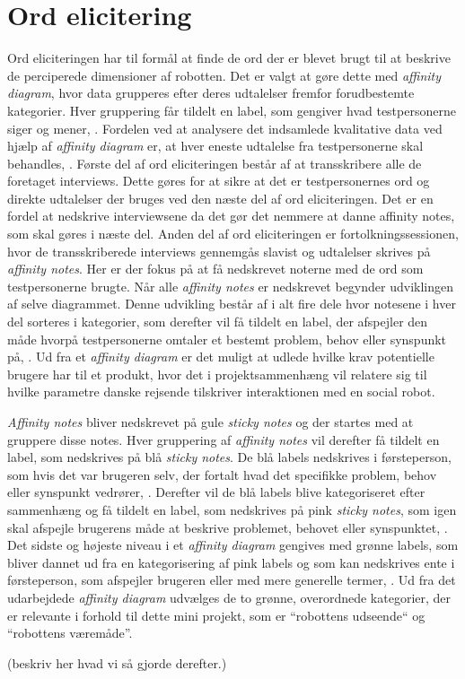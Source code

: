 \section*{Ord elicitering}
\label{OrdElicitering}

Ord eliciteringen har til formål at finde de ord der er blevet brugt til at beskrive de perciperede dimensioner af robotten. 
Det er valgt at gøre dette med \textit{affinity diagram}, hvor data grupperes efter deres udtalelser fremfor forudbestemte kategorier. Hver gruppering får tildelt en label, som gengiver hvad testpersonerne siger og mener, \parencite[s. 159]{Book:BuildingAnAffinity}. Fordelen ved at analysere det indsamlede kvalitative data ved hjælp af \textit{affinity diagram} er, at hver eneste udtalelse fra testpersonerne skal behandles, \parencite[s. 25]{PDF:ConsolidationIdeationAffinity}. \blankline
%
Første del af ord eliciteringen består af at transskribere alle de foretaget interviews. Dette gøres for at sikre at det er testpersonernes ord og direkte udtalelser der bruges ved den næste del af ord eliciteringen. Det er en fordel at nedskrive interviewsene da det gør det nemmere at danne affinity notes, som skal gøres i næste del. \blankline
%
Anden del af ord eliciteringen er fortolkningssessionen, hvor de transskriberede interviews gennemgås slavist og udtalelser skrives på \textit{affinity notes}. Her er der fokus på at få nedskrevet noterne med de ord som testpersonerne brugte. \blankline
%
Når alle \textit{affinity notes} er nedskrevet begynder udviklingen af selve diagrammet. Denne udvikling består af i alt fire dele hvor notesene i hver del sorteres i kategorier, som derefter vil få tildelt en label, der afspejler den måde hvorpå testpersonerne omtaler et bestemt problem, behov eller synspunkt på, \parencite[s. 159]{Book:BuildingAnAffinity}. Ud fra et \textit{affinity diagram} er det muligt at udlede hvilke krav potentielle brugere har til et produkt, hvor det i projektsammenhæng vil relatere sig til hvilke parametre danske rejsende tilskriver interaktionen med en social robot. 

\textit{Affinity notes} bliver nedskrevet på gule \textit{sticky notes} og der startes med at gruppere disse notes. Hver gruppering af \textit{affinity notes} vil derefter få tildelt en label, som nedskrives på blå \textit{sticky notes}. De blå labels nedskrives i førsteperson, som hvis det var brugeren selv, der fortalt hvad det specifikke problem, behov eller synspunkt vedrører, \parencite[s. 160]{Book:BuildingAnAffinity}. Derefter vil de blå labels blive kategoriseret efter sammenhæng og få tildelt en label, som nedskrives på pink \textit{sticky notes}, som igen skal afspejle brugerens måde at beskrive problemet, behovet eller synspunktet, \parencite[s. 160]{Book:BuildingAnAffinity}. Det sidste og højeste niveau i et \textit{affinity diagram} gengives med grønne labels, som bliver dannet ud fra en kategorisering af pink labels og som kan nedskrives ente i førsteperson, som afspejler brugeren eller med mere generelle termer, \parencite[s. 160]{Book:BuildingAnAffinity}. \blankline
%
Ud fra det udarbejdede \textit{affinity diagram} udvælges de to grønne, overordnede kategorier, der er relevante i forhold til dette mini projekt, som er ``robottens udseende`` og ``robottens væremåde''. 

(beskriv her hvad vi så gjorde derefter.)